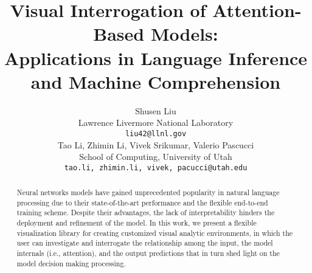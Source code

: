\documentclass[11pt,a4paper]{article}
\title{Visual Interrogation of Attention-Based Models: \\ Applications in Language Inference and Machine Comprehension}
\author{Shusen Liu \\
  Lawrence Livermore National Laboratory\\
  {\tt liu42@llnl.gov} \\\And
  Tao Li,  Zhimin Li,  Vivek Srikumar, Valerio Pascucci \\
  School of Computing, University of Utah\\
    {\tt {tao.li, zhimin.li, vivek, pacucci}@utah.edu}
}
\date{}
\begin{document}
\maketitle

\begin{abstract}
Neural networks models have gained unprecedented popularity in natural language processing due to their state-of-the-art performance and the flexible end-to-end training scheme. Despite their advantages, the lack of interpretability hinders the deployment and refinement of the model.
%
In this work, we present a flexible visualization library for creating customized visual analytic environments, in which the user can investigate and interrogate the relationship among the input, the model internals (i.e., attention), and the output predictions that in turn shed light on the model decision making processing.
 
\end{abstract}









\end{document}
